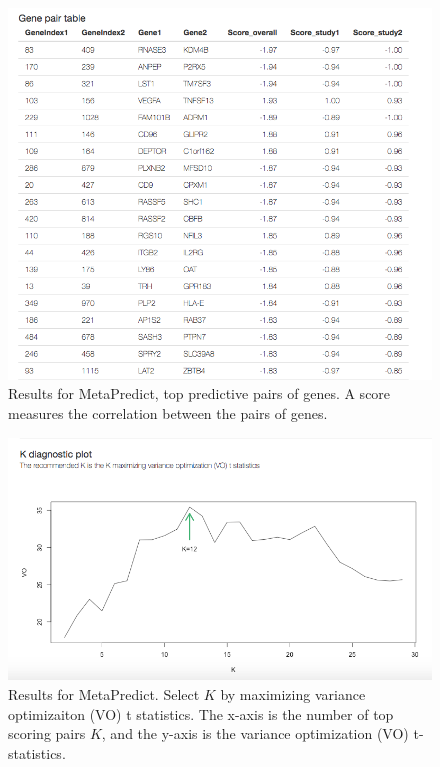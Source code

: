 \begin{figure}[H]
\begin{center}
\includegraphics[scale=0.5]{./figure/MetaPredict/MetaPredictresult1.png}
\caption{Results for MetaPredict, top predictive pairs of genes.
A score measures the correlation between the pairs of genes.
}
\label{fig:MetaPredictresult1}
\end{center}
\end{figure}


\begin{figure}[H]
\begin{center}
\includegraphics[scale=0.5]{./figure/MetaPredict/MetaPredictresult2.png}
\caption{Results for MetaPredict. 
Select $K$ by maximizing variance optimizaiton (VO) t statistics.
The x-axis is the number of top scoring pairs $K$, 
and the y-axis is the variance optimization (VO) t-statistics.
}
\label{fig:MetaPredictresult2}
\end{center}
\end{figure}


